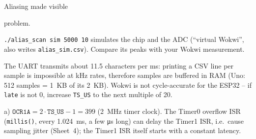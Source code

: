 \begin{exercise}{Aliasing made visible}{\Wokwi}
\begin{tasks}
    problem.
  \item \texttt{./alias\_scan sim 5000 10} simulates the chip and the ADC
    (``virtual Wokwi'', also writes \texttt{alias\_sim.csv}). Compare its
    peaks with your Wokwi measurement.
\end{tasks}
\begin{hint}
The UART transmits about 11.5 characters per ms: printing a CSV line per
sample is impossible at kHz rates, therefore samples are buffered in RAM
(Uno: 512 samples = \SI{1}{KB} of its \SI{2}{KB}). Wokwi is not
cycle-accurate for the ESP32 -- if \texttt{late} is not 0, increase
\texttt{TS\_US} to the next multiple of 20.
\end{hint}
\end{exercise}

\begin{solution}
a) $\texttt{OCR1A}=2\cdot\texttt{TS\_US}-1=399$ (\SI{2}{MHz} timer clock).
The Timer0 overflow ISR (\texttt{millis()}, every \SI{1.024}{ms}, a few
\si{\micro s} long) can delay the Timer1 ISR, i.e.\ cause sampling jitter
(Sheet~4); the Timer1 ISR itself starts with a constant latency.


\end{solution}
